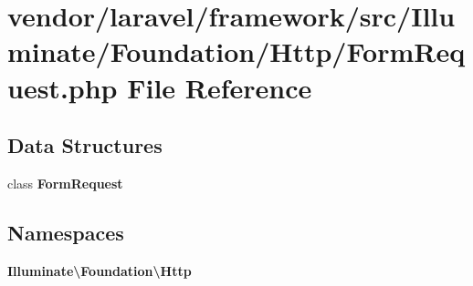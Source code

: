 \section{vendor/laravel/framework/src/\+Illuminate/\+Foundation/\+Http/\+Form\+Request.php File Reference}
\label{_form_request_8php}
\subsection*{Data Structures}
\begin{DoxyCompactItemize}
\item 
class {\bf Form\+Request}
\end{DoxyCompactItemize}
\subsection*{Namespaces}
\begin{DoxyCompactItemize}
\item 
 {\bf Illuminate\textbackslash{}\+Foundation\textbackslash{}\+Http}
\end{DoxyCompactItemize}
